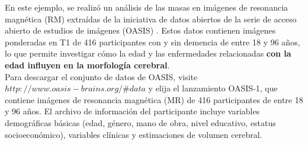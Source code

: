 \documentclass[11pt,letterpaper]{article}
\begin{document}
En este ejemplo, se realizó un análisis de las masas en imágenes de resonancia magnética (RM) extraídas de la iniciativa de datos abiertos de la serie de acceso abierto de estudios de imágenes (OASIS) \cite{cerebro}. Estos datos contienen imágenes ponderadas en T1 de 416 participantes con y sin demencia de entre 18 y 96 años, lo que permite investigar cómo la edad y las enfermedades relacionadas \textbf{con la edad influyen en la morfología cerebral}.\\

Para descargar el conjunto de datos de OASIS, visite $http://www.oasis-brains.org/\#data$ y elija el lanzamiento OASIS-1, que contiene imágenes de resonancia magnética (MR) de 416 participantes de entre 18 y 96 años. El archivo de información del participante incluye variables demográficas básicas (edad, género, mano de obra, nivel educativo, estatus socioeconómico), variables clínicas y estimaciones de volumen cerebral. 
\end{document}
